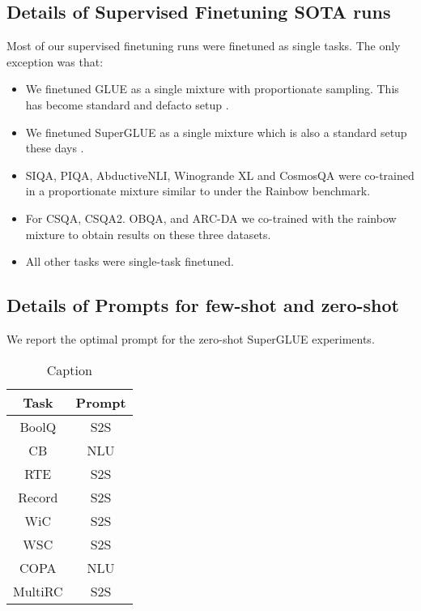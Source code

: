 \documentclass[10pt]{article}
\begin{document}
\subsection{Details of Supervised Finetuning SOTA runs}
Most of our supervised finetuning runs were finetuned as single tasks. The only exception was that:
\begin{itemize}
    \item We finetuned GLUE as a single mixture with proportionate sampling. This has become standard and defacto setup \citep{raffel2019exploring,he2022hyperprompt,tay2020hypergrid,tay2021scale}.
    \item We finetuned SuperGLUE as a single mixture which is also a standard setup these days \citep{fedus2021switch,raffel2019exploring,chowdhery2022palm}.
    \item SIQA, PIQA, AbductiveNLI, Winogrande XL and CosmosQA were co-trained in a proportionate mixture similar to \citep{lourie2021unicorn} under the Rainbow benchmark.
    \item For CSQA, CSQA2. OBQA, and ARC-DA we co-trained with the rainbow mixture to obtain results on these three datasets. 
    \item All other tasks were single-task finetuned. 
\end{itemize}

\subsection{Details of Prompts for few-shot and zero-shot}
We report the optimal prompt for the zero-shot SuperGLUE experiments.
\begin{table}[H]
    \centering
    \begin{tabular}{c|c}
    \toprule
        Task &  Prompt \\
        \midrule
        BoolQ  & S2S \\ 
        CB & NLU \\ 
        RTE & S2S \\ 
        Record & S2S \\ 
        WiC & S2S \\
        WSC & S2S \\
        COPA & NLU \\
        MultiRC & S2S \\
        \bottomrule
    \end{tabular}
    \caption{Caption}
    \label{tab:my_label}
\end{table}

\newpage
\end{document}
